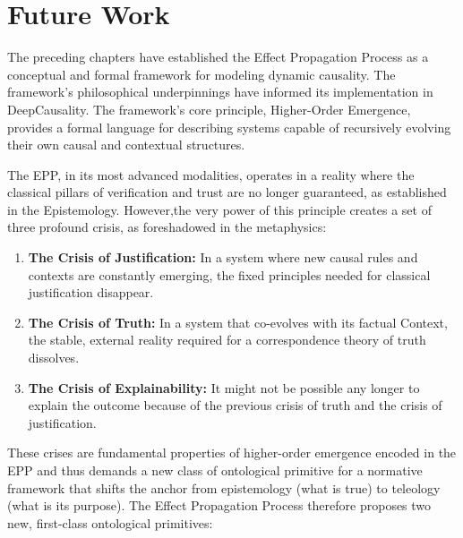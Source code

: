 \section{Future Work}
\label{sec:future_work}


The preceding chapters have established the Effect Propagation Process as a conceptual and formal framework for modeling dynamic causality. 
The framework's  philosophical underpinnings have informed its implementation in DeepCausality. The framework's core principle, 
Higher-Order Emergence, provides a formal language for describing systems capable of recursively evolving their own causal and contextual structures.

The EPP, in its most advanced modalities, operates in a reality where the classical pillars of verification and trust are no longer guaranteed,
as established in the Epistemology. However,the very power of this principle creates a set of three profound crisis,
 as foreshadowed in the metaphysics: 

\begin{enumerate}
	\item \textbf{The Crisis of Justification:} In a system where new causal rules and contexts are constantly emerging, the fixed principles needed for classical justification disappear.
	\item \textbf{The Crisis of Truth:} In a system that co-evolves with its factual Context, the stable, external reality required for a correspondence theory of truth dissolves.
	\item \textbf{The Crisis of Explainability:} It might not be possible any longer to explain the outcome because of the previous crisis of truth and the crisis of justification. 
\end{enumerate}


These crises are fundamental properties of higher-order emergence encoded in the EPP and thus demands a new class of ontological primitive for a normative framework that shifts the  anchor from epistemology (what is true) to teleology (what is its purpose). 
The Effect Propagation Process therefore proposes two new, first-class ontological primitives:

